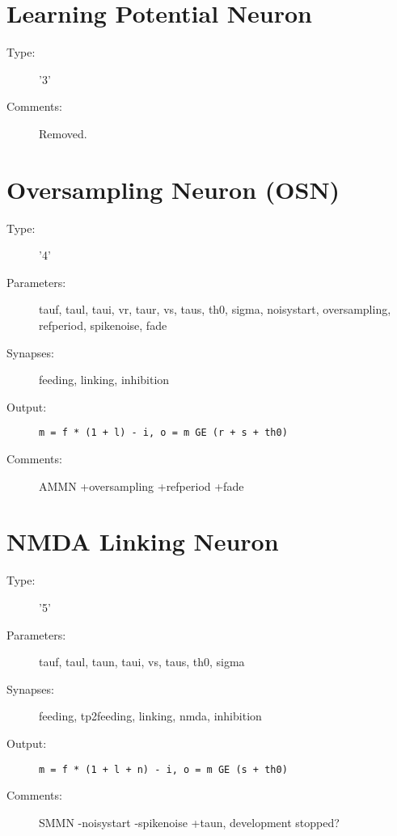 \documentclass[12pt]{article}
\begin{document}
\section{Learning Potential Neuron}
\begin{description}
\item[Type:] '3'
\item[Comments:] Removed.
\end{description}



\section{Oversampling Neuron (OSN)}
\begin{description}
\item[Type:] '4'

\item[Parameters:] tauf, taul, taui, vr, taur, vs, taus, th0, sigma, noisystart, 
              oversampling, refperiod, spikenoise, fade

\item[Synapses:] feeding, linking, inhibition

\item[Output:] \texttt{m = f * (1 + l) - i, o = m GE (r + s + th0)}

\item[Comments:] AMMN +oversampling +refperiod +fade
\end{description}



\section{NMDA Linking Neuron}
\begin{description}
\item[Type:] '5'

\item[Parameters:] tauf, taul, taun, taui, vs, taus, th0, sigma

\item[Synapses:] feeding, tp2feeding, linking, nmda, inhibition

\item[Output:] \texttt{m = f * (1 + l + n) - i, o = m GE (s + th0)}

\item[Comments:] SMMN -noisystart -spikenoise +taun, development stopped?
\end{description}
\end{document}
